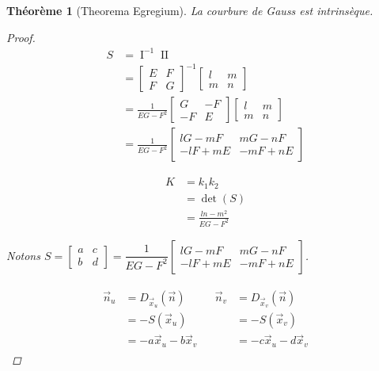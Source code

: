 \documentclass{report}
\newtheorem*{thm}{Th\'eor\`eme}
\theoremstyle{definition}
\theoremstyle{remark}
\def\pff{\operatorname{I}}
\def\dff{\operatorname{II}}
\begin{document}
	\begin{thm}[Theorema Egregium]
		La courbure de Gauss est intrins\`eque.
		\begin{proof}
			\begin{align*}
				S&= \pff^{-1}\dff\\
				&= \begin{bmatrix}
					E&F\\F&G
				\end{bmatrix}^{-1} \begin{bmatrix}
					l&m\\m&n
				\end{bmatrix}\\
				&= \frac{1}{EG-F^2}\begin{bmatrix}
					G&-F\\-F&E
				\end{bmatrix} \begin{bmatrix}
					l&m\\m&n
				\end{bmatrix}\\
				&= \frac{1}{EG-F^2}\begin{bmatrix}
					lG-mF&mG-nF\\
					-lF+mE&-mF+nE
				\end{bmatrix}
			\end{align*}

			\begin{align*}
				K&= k_1k_2\\
				&= \det(S)\\
				&= \frac{ln-m^2}{EG-F^2}
			\end{align*}

			Notons $S = \begin{bmatrix}
				a&c\\b&d
			\end{bmatrix} = \dfrac{1}{EG-F^2}\begin{bmatrix}
				lG-mF&mG-nF\\
				-lF+mE&-mF+nE
			\end{bmatrix}$.

			\begin{align*}
				\begin{split}
					\vec n_u&= D_{\vec x_u}(\vec n)\\
					&= -S(\vec x_u)\\
					&= -a\vec x_u-b\vec x_v
				\end{split}
				&
				\begin{split}
					\vec n_v&= D_{\vec x_v}(\vec n)\\
					&= -S(\vec x_v)\\
					&= -c\vec x_u-d\vec x_v
				\end{split}
			\end{align*}


\end{proof}
\end{thm}
\end{document}
